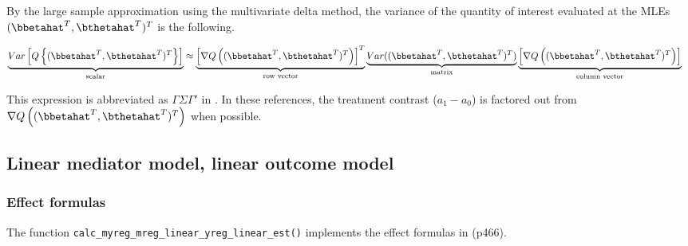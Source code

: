 \documentclass[dvipdfmx,10pt]{article}
\begin{document}
By the large sample approximation using the multivariate delta method, the variance of the quantity of interest evaluated at the MLEs \((\bbetahat^{T},\bthetahat^{T})^{T}\) is the following.

\begin{align*}
  \underbrace{Var \left[ Q\left\{ (\bbetahat^{T},\bthetahat^{T})^{T} \right\} \right]}_{\text{scalar}}
  &\approx
  \underbrace{\left[ \nabla Q \left( (\bbetahat^{T},\bthetahat^{T})^{T} \right) \right]^{T}}_{\text{row vector}}
  \underbrace{Var((\bbetahat^{T},\bthetahat^{T})^{T})}_{\text{matrix}}
  \underbrace{\left[ \nabla Q \left( (\bbetahat^{T},\bthetahat^{T})^{T} \right) \right]}_{\text{column vector}}
\end{align*}

This expression is abbreviated as \(\Gamma\Sigma\Gamma'\) in \cite{vanderweeleExplanationCausalInference2015,valeriMediationAnalysisAllowing2013,valeriSASMacroCausal2015}. In these references, the treatment contrast (\(a_{1}-a_{0}\)) is factored out from \(\nabla Q \left( (\bbetahat^{T},\bthetahat^{T})^{T} \right)\) when possible.

\subsection{Linear mediator model, linear outcome model}
\label{sec:orgf9c21b1}
\subsubsection{Effect formulas}
\label{sec:orge2197d4}
The function \texttt{calc\_myreg\_mreg\_linear\_yreg\_linear\_est()} implements the effect formulas in \cite{vanderweeleExplanationCausalInference2015} (p466).
\end{document}
